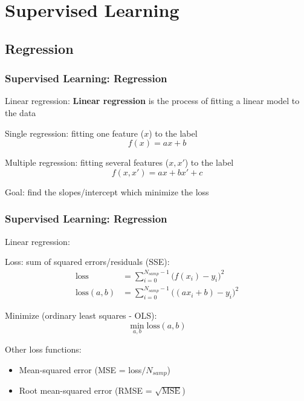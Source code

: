 \documentclass{beamer}
\begin{document}
\section{Supervised Learning}
\subsection{Regression}

\begin{frame}	
\end{frame}

\begin{frame}
	\frametitle{Supervised Learning: Regression}
	
	\begin{alertblock}{Linear regression:}
		\textbf{Linear regression} is the process of fitting a linear model to the data
		
		\vspace{20pt}
		Single regression: fitting one feature ($x$) to the label
		\begin{equation*}
			f(x) = a x + b
		\end{equation*}
		
		Multiple regression: fitting several features ($x,x'$) to the label
		\begin{equation*}
			f(x, x') = a x + b x' + c
		\end{equation*}
		
		\vspace{10pt}
		Goal: find the slopes/intercept which minimize the loss
	\end{alertblock}

\end{frame}

\begin{frame}
	\frametitle{Supervised Learning: Regression}
	
	\begin{block}{Linear regression:}
		\small
		
		Loss: sum of squared errors/residuals (SSE):
		\begin{align*}
			\textrm{loss} & = \sum_{i=0}^{N_{samp}-1} \Big( f(x_i) - y_i \Big)^2 \\
			\textrm{loss}(a,b) & = \sum_{i=0}^{N_{samp}-1} \Big( (a x_i + b) - y_i \Big)^2
		\end{align*}
		
		Minimize (ordinary least squares - OLS):
		\begin{equation*}
			\min_{a,b} \textrm{loss}(a,b)
		\end{equation*}
		
		Other loss functions:
		\begin{itemize}
			\item Mean-squared error (MSE = loss$/N_{samp}$)
			\item Root mean-squared error (RMSE = $\sqrt{\textrm{MSE}}$)
		\end{itemize}
	\end{block}

\end{frame}
\end{document}
